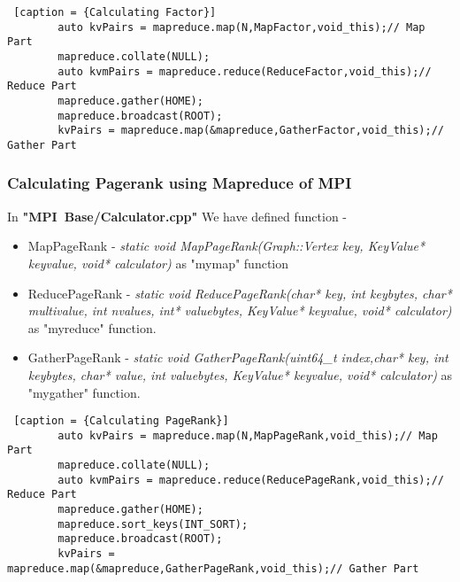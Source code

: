 \documentclass{article}
\begin{document}
    
    \begin{lstlisting} [caption = {Calculating Factor}]
        auto kvPairs = mapreduce.map(N,MapFactor,void_this);// Map Part
        mapreduce.collate(NULL);
        auto kvmPairs = mapreduce.reduce(ReduceFactor,void_this);// Reduce Part
        mapreduce.gather(HOME);
        mapreduce.broadcast(ROOT);
        kvPairs = mapreduce.map(&mapreduce,GatherFactor,void_this);// Gather Part
    \end{lstlisting}
    
    \subsubsection{Calculating Pagerank using Mapreduce of MPI}
    In \textbf{"MPI\ Base/Calculator.cpp"} We have defined function - 
    \begin{itemize}
        \item MapPageRank - \textit{static void MapPageRank(Graph::Vertex key, KeyValue* keyvalue, void* calculator)} as "mymap" function
        \item ReducePageRank - \textit{static void ReducePageRank(char* key, int keybytes, char* multivalue, int nvalues, int* valuebytes, KeyValue* keyvalue, void* calculator)} as "myreduce" function.
        \item GatherPageRank - \textit{static void GatherPageRank(uint64\_t index,char* key, int keybytes, char* value, int valuebytes, KeyValue* keyvalue, void* calculator)} as "mygather" function.
    \end{itemize}
    
    \begin{lstlisting} [caption = {Calculating PageRank}]
        auto kvPairs = mapreduce.map(N,MapPageRank,void_this);// Map Part
        mapreduce.collate(NULL);
        auto kvmPairs = mapreduce.reduce(ReducePageRank,void_this);// Reduce Part
        mapreduce.gather(HOME);
        mapreduce.sort_keys(INT_SORT);
        mapreduce.broadcast(ROOT);
        kvPairs = mapreduce.map(&mapreduce,GatherPageRank,void_this);// Gather Part
    \end{lstlisting}
    
\end{document}
